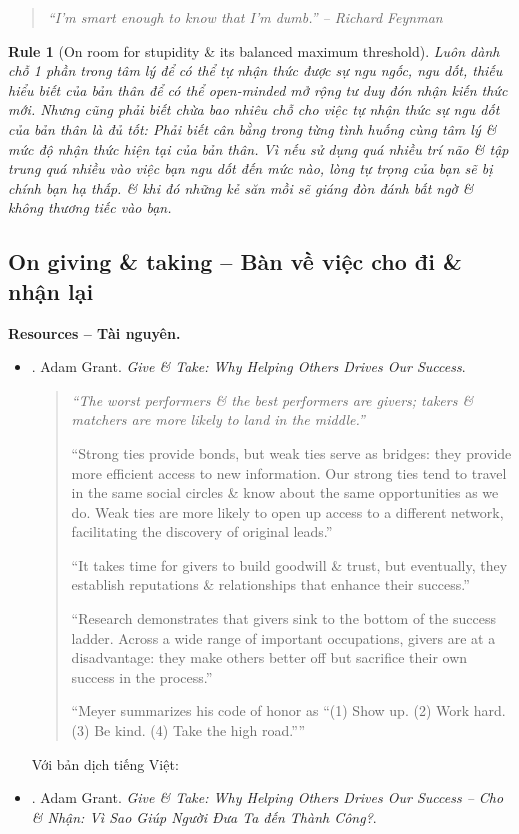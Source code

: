 \documentclass[12pt]{article}
\newtheorem{Rule}{Rule}
\begin{document}
\begin{quote}\it
	``I'm smart enough to know that I'm dumb.'' -- {\sc Richard Feynman}
\end{quote}

\begin{Rule}[On room for stupidity \& its balanced maximum threshold]
	Luôn dành chỗ 1 phần trong tâm lý để có thể tự nhận thức được sự ngu ngốc, ngu dốt, thiếu hiểu biết của bản thân để có thể open-minded mở rộng tư duy đón nhận kiến thức mới. Nhưng cũng phải biết chừa bao nhiêu chỗ cho việc tự nhận thức sự ngu dốt của bản thân là đủ tốt: Phải biết cân bằng trong từng tình huống cùng tâm lý \& mức độ nhận thức hiện tại của bản thân. Vì nếu sử dụng quá nhiều trí não \& tập trung quá nhiều vào việc bạn ngu dốt đến mức nào, lòng tự trọng của bạn sẽ bị chính bạn hạ thấp. \& khi đó những kẻ săn mồi sẽ giáng đòn đánh bất ngờ \& không thương tiếc vào bạn.
\end{Rule}


\subsection{On giving \& taking -- Bàn về việc cho đi \& nhận lại}
\noindent\textbf{\textsf{Resources -- Tài nguyên.}}
\begin{itemize}
	\item \cite{Grant_give_take}. {\sc Adam Grant}. {\it Give \& Take: Why Helping Others Drives Our Success}.
	\begin{quotation}\it
		``The worst performers \& the best performers are givers; takers \& matchers are more likely to land in the middle.''
		
		``Strong ties provide bonds, but weak ties serve as bridges: they provide more efficient access to new information. Our strong ties tend to travel in the same social circles \& know about the same opportunities as we do. Weak ties are more likely to open up access to a different network, facilitating the discovery of original leads.''
		
		``It takes time for givers to build goodwill \& trust, but eventually, they establish reputations \& relationships that enhance their success.''
		
		``Research demonstrates that givers sink to the bottom of the success ladder. Across a wide range of important occupations, givers are at a disadvantage: they make others better off but sacrifice their own success in the process.''
		
		``Meyer summarizes his code of honor as ``(1) Show up. (2) Work hard. (3) Be kind. (4) Take the high road.''''
	\end{quotation}
	Với bản dịch tiếng Việt:
	\item \cite{Grant_give_take_VN}. {\sc Adam Grant}. {\it Give \& Take: Why Helping Others Drives Our Success -- Cho \& Nhận: Vì Sao Giúp Người Đưa Ta đến Thành Công?}.
\end{itemize}
\end{document}

